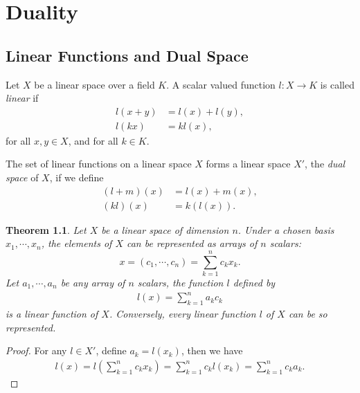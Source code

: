 \documentclass[11pt]{book}
\newtheorem{theorem}{Theorem}[chapter]
\theoremstyle{definition}
\numberwithin{equation}{chapter}
\begin{document}
\medskip





\chapter{Duality}\label{chapter_Duality}
\section{Linear Functions and Dual Space}

Let $X$ be a linear space over a field $K$. A scalar valued function $l:X\to K$ is called \emph{linear} if 
\begin{align*}
    l(x+y) &= l(x) + l(y), \\
    l(kx) &= k l(x),
\end{align*}
for all $x,y\in X$, and for all $k\in K$.

The set of linear functions on a linear space $X$ forms a linear space $X'$, the \emph{dual space} of $X$, if we define 
\begin{align*}
    (l+m)(x) &= l(x) + m(x), \\
    (kl)(x) &= k(l(x)).
\end{align*}

\medskip

\begin{theorem}\label{theorem_dual}
Let $X$ be a linear space of dimension $n$. Under a chosen basis $x_1,\cdots,x_n$, the elements of $X$ can be represented as arrays of $n$ scalars:
$$x = (c_1,\cdots,c_n) = \sum^n_{k=1}c_k x_k.$$
Let $a_1,\cdots,a_n$ be any array of $n$ scalars, the function $l$ defined by
\begin{align*}
    l(x) = \sum^n_{k=1} a_k c_k
\end{align*}
is a linear function of $X$. Conversely, every linear function $l$ of $X$ can be so represented.
\end{theorem}
\begin{proof}
For any $l\in X'$, define $a_k = l(x_k)$, then we have 
\begin{align*}
    l(x) = l\left(\sum^n_{k=1}c_k x_k \right) = \sum^n_{k=1}c_k l(x_k) = \sum^n_{k=1}c_k a_k.
\end{align*}
\end{proof}

\medskip
\end{document}
